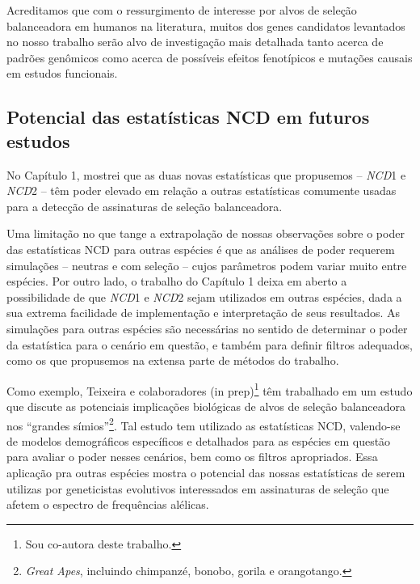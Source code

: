 \begin{refsection}
   Acreditamos que com o ressurgimento de interesse por alvos de seleção balanceadora em humanos na literatura, muitos dos genes candidatos levantados  no nosso trabalho serão alvo de investigação mais detalhada tanto acerca de padrões genômicos como acerca de possíveis efeitos fenotípicos e mutações causais em estudos funcionais.


\subsection{Potencial das estatísticas NCD em futuros estudos}


	No Capítulo 1, mostrei que as duas novas estatísticas que propusemos -- \emph{NCD}1 e \emph{NCD}2 -- têm poder elevado em relação a outras estatísticas comumente usadas para a detecção de assinaturas de seleção balanceadora. 
  
    Uma limitação no que tange a extrapolação de nossas observações sobre o poder das estatísticas NCD para outras espécies é que as análises de poder requerem simulações -- neutras e com seleção -- cujos parâmetros podem variar muito entre espécies. Por outro lado, o trabalho do Capítulo 1 deixa em aberto a possibilidade de que \emph{NCD}1 e \emph{NCD}2 sejam utilizados em outras espécies, dada a sua extrema facilidade de implementação e interpretação de seus resultados. As simulações para outras espécies são necessárias no sentido de determinar o poder da estatística para o cenário em questão, e também para definir filtros adequados, como os que propusemos na extensa parte de métodos do trabalho.
   
    Como exemplo, Teixeira e colaboradores (in prep)\footnote{Sou co-autora deste trabalho.} têm trabalhado em um estudo que discute as potenciais implicações biológicas de alvos de seleção balanceadora nos \enquote{grandes símios}\footnote{\emph{Great Apes}, incluindo chimpanzé, bonobo, gorila e orangotango.}. Tal estudo tem utilizado as estatísticas NCD, valendo-se de modelos demográficos específicos e detalhados para as espécies em questão para avaliar o poder nesses cenários, bem como os filtros apropriados. Essa aplicação pra outras espécies mostra o potencial das nossas estatísticas de serem utilizas por geneticistas evolutivos interessados em assinaturas de seleção que afetem o espectro de frequências alélicas. 


\renewcommand*{\bibfont}{\footnotesize}
\printbibliography[heading=bibintoc] %
%
\end{refsection}